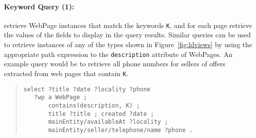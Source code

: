 \paragraph{Keyword Query (1):} retrieve WebPage instances that match the keywords \verb|K|, and for each page retrieve the values of the fields to display in the query results.
Similar queries can be used to retrieve instances of any of the types shown in Figure~\ref{fig:ldviews} by using the appropriate path expression to the \verb|description| attribute of WebPages.
An example query would be to retrieve all phone numbers for sellers of offers extracted from web pages that contain \verb|K|.
\begin{quote}
{\footnotesize
\begin{verbatim}
select ?title ?date ?locality ?phone
   ?wp a WebPage ; 
       contains(description, K) ;   
       title ?title ; created ?date ;
       mainEntity/availableAt ?locality ;
       mainEntity/seller/telephone/name ?phone .
\end{verbatim}}
\end{quote}

